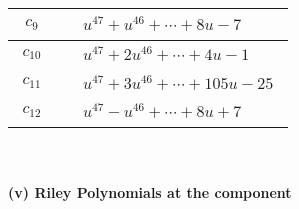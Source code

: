 \documentclass[1p]{elsarticle_modified}
\theoremstyle{definition}
\begin{document}
\begin{tabular}{m{50pt}|m{274pt}}
\hline $$\begin{aligned}c_{9}\end{aligned}$$&$\begin{aligned}
&u^{47}+u^{46}+\cdots+8 u-7
\end{aligned}$\\
\hline $$\begin{aligned}c_{10}\end{aligned}$$&$\begin{aligned}
&u^{47}+2 u^{46}+\cdots+4 u-1
\end{aligned}$\\
\hline $$\begin{aligned}c_{11}\end{aligned}$$&$\begin{aligned}
&u^{47}+3 u^{46}+\cdots+105 u-25
\end{aligned}$\\
\hline $$\begin{aligned}c_{12}\end{aligned}$$&$\begin{aligned}
&u^{47}- u^{46}+\cdots+8 u+7
\end{aligned}$\\
\hline
\end{tabular}\\~\\
\newpage\renewcommand{\arraystretch}{1}
\flushleft \textbf{(v) Riley Polynomials at the component}\newline \\
\end{document}
